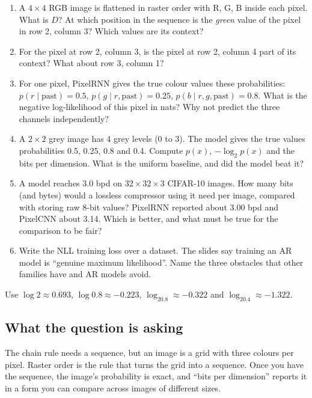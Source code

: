 \documentclass[12pt,a4paper]{article}
\begin{document}
\begin{enumerate}[label=(\alph*)]
  \item[\colorbox{yellow}{(a)}] A $4\times4$ RGB image is flattened in raster order with R, G, B inside each pixel. What is $D$? At which position in the sequence is the \emph{green} value of the pixel in row 2, column 3? Which values are its context?
  \item For the pixel at row 2, column 3, is the pixel at row 2, column 4 part of its context? What about row 3, column 1?
  \item For one pixel, PixelRNN gives the true colour values these probabilities: $p(r\mid\text{past})=0.5$, $p(g\mid r,\text{past})=0.25$, $p(b\mid r,g,\text{past})=0.8$. What is the negative log-likelihood of this pixel in nats? Why not predict the three channels independently?
  \item[\colorbox{yellow}{(d)}] A $2\times2$ grey image has 4 grey levels (0 to 3). The model gives the true values probabilities 0.5, 0.25, 0.8 and 0.4. Compute $p(x)$, $-\log_2 p(x)$ and the bits per dimension. What is the uniform baseline, and did the model beat it?
  \item[\colorbox{yellow}{(e)}] A model reaches 3.0 bpd on $32\times32\times3$ CIFAR-10 images. How many bits (and bytes) would a lossless compressor using it need per image, compared with storing raw 8-bit values? PixelRNN reported about 3.00 bpd and PixelCNN about 3.14. Which is better, and what must be true for the comparison to be fair?
  \item[\colorbox{yellow}{(f)}] Write the NLL training loss over a dataset. The slides say training an AR model is ``genuine maximum likelihood''. Name the three obstacles that other families have and AR models avoid.
\end{enumerate}
Use $\log 2\approx0.693$, $\log0.8\approx-0.223$, $\log_20.8\approx-0.322$ and $\log_20.4\approx-1.322$.

\subsection{What the question is asking}

The chain rule needs a sequence, but an image is a grid with three colours per pixel. Raster order is the rule that turns the grid into a sequence. Once you have the sequence, the image's probability is exact, and ``bits per dimension'' reports it in a form you can compare across images of different sizes.
\end{document}
